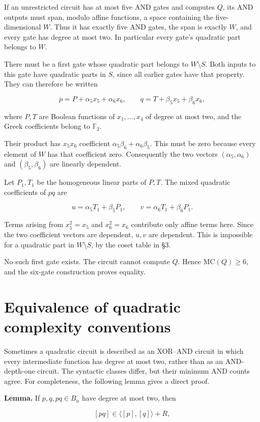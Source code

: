 If an unrestricted circuit has at most five AND gates and computes $Q$, its AND outputs must span, modulo affine functions, a space containing the five-dimensional $W$. Thus it has exactly five AND gates, the span is exactly $W$, and every gate has degree at most two. In particular every gate's quadratic part belongs to $W$.

There must be a first gate whose quadratic part belongs to $W\setminus S$. Both inputs to this gate have quadratic parts in $S$, since all earlier gates have that property. They can therefore be written

\[p=P+\alpha_5x_5+\alpha_6x_6,\qquad
q=T+\beta_5x_5+\beta_6x_6,\]

where $P,T$ are Boolean functions of $x_1,\ldots,x_4$ of degree at most two, and the Greek coefficients belong to $\mathbb F_2$.

Their product has $x_5x_6$ coefficient $\alpha_5\beta_6+\alpha_6\beta_5$. This must be zero because every element of $W$ has that coefficient zero. Consequently the two vectors $(\alpha_5,\alpha_6)$ and $(\beta_5,\beta_6)$ are linearly dependent.

Let $P_1,T_1$ be the homogeneous linear parts of $P,T$. The mixed quadratic coefficients of $pq$ are

\[u=\alpha_5T_1+\beta_5P_1,\qquad
v=\alpha_6T_1+\beta_6P_1.\]

Terms arising from $x_5^2=x_5$ and $x_6^2=x_6$ contribute only affine terms here. Since the two coefficient vectors are dependent, $u,v$ are dependent. This is impossible for a quadratic part in $W\setminus S$, by the coset table in \S{}3.

No such first gate exists. The circuit cannot compute $Q$. Hence $\mathrm{MC}(Q)\ge6$, and the six-gate construction proves equality.

\section{Equivalence of quadratic complexity conventions}

Sometimes a quadratic circuit is described as an XOR--AND circuit in which every intermediate function has degree at most two, rather than as an AND-depth-one circuit. The syntactic classes differ, but their minimum AND counts agree. For completeness, the following lemma gives a direct proof.

\textbf{Lemma.} If $p,q,pq\in B_n$ have degree at most two, then

\[[pq]\in\langle[p],[q]\rangle+R,\]

